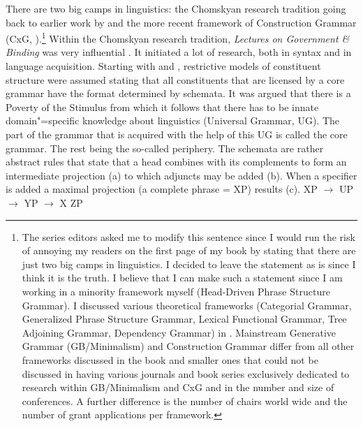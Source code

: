 There are two big camps in linguistics: the Chomskyan research tradition
\citep{Chomsky81a,Chomsky95a-u} going back to earlier work by \citet{Chomsky57a} and the
more recent framework of Construction Grammar (CxG, \citealt*{FKoC88a,Goldberg95a,Goldberg2006a,Tomasello2003a}).\footnote{%
  The series editors asked me to modify this sentence since I would run the risk of annoying my
  readers on the first page of my book by stating that there are just two big camps in linguistics. I decided to leave the statement as is
  since I think it is the truth. I believe that I can make such a statement since I am working in a
  minority framework myself (Head-Driven Phrase Structure Grammar). I discussed various theoretical frameworks (Categorial Grammar,
  Generalized Phrase Structure Grammar, Lexical Functional Grammar, Tree Adjoining Grammar,
  Dependency Grammar) in . Mainstream Generative Grammar (GB/Minimalism) and Construction Grammar
  differ from all other frameworks discussed in the book and smaller ones that could not be discussed
  in having various journals and book series exclusively dedicated to research within GB/Minimalism
  and CxG and in the number and size of conferences. A further difference is the number of chairs world wide and
  the number of grant applications per framework.
}
Within the Chomskyan research tradition, \emph{Lectures on Government \& Binding} was very
influential \citep{Chomsky81a}. It initiated a lot of research, both 
in syntax and in language acquisition. Starting with \citet{Chomsky73a} and \citet{Jackendoff77a},
restrictive models of constituent structure were assumed stating that all constituents that are
licensed by a core grammar have the format determined by \xbar schemata. It was argued that there is
a Poverty of the Stimulus from which it follows that there has to be innate domain"=specific
knowledge about linguistics (Universal Grammar, UG). The part of the grammar that is acquired with
the help of this UG is called the core grammar. The rest being the so-called periphery. The \xbar
schemata are rather abstract rules that state that a head combines with its complements to form an
intermediate projection (a) to which adjuncts may be added (b). When a specifier is added a maximal
projection (a complete phrase = XP) results (c).
\eal
\ex XP $\to$ UP \xbar
\ex \xbar $\to$ \xbar YP
\ex \xbar $\to$ X ZP
